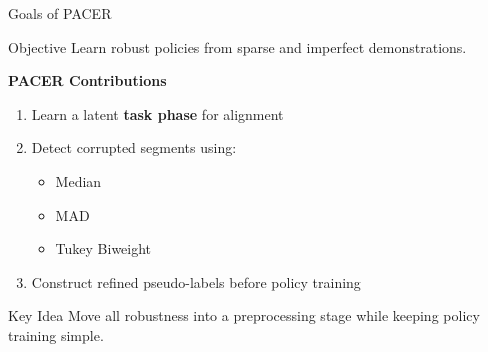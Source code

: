 \begin{frame}{Goals of PACER}

    \begin{block}{Objective}
        Learn robust policies from sparse and imperfect demonstrations.
    \end{block}

    \textbf{PACER Contributions}
    \begin{enumerate}
        \item Learn a latent \textbf{task phase} for alignment
        \item Detect corrupted segments using:
            \begin{itemize}
                \item Median
                \item MAD
                \item Tukey Biweight
            \end{itemize}
        \item Construct refined pseudo-labels before policy training
    \end{enumerate}

    \vspace{0.5em}

    \begin{alertblock}{Key Idea}
        Move all robustness into a preprocessing stage while keeping policy training simple.
    \end{alertblock}

\end{frame}
